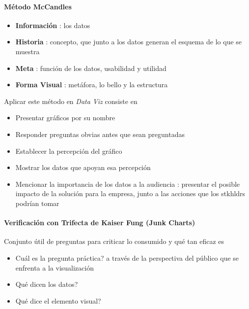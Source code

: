 \paragraph{Método McCandles}
\begin{itemize}
    \item {\textbf{Información} : los datos}
    \item {\textbf{Historia} : concepto, que junto a los datos generan el esquema de lo que se muestra}
    \item {\textbf{Meta} : función de los datos, usabilidad y utilidad}
    \item {\textbf{Forma Visual} : metáfora, lo bello y la estructura}
\end{itemize}
Aplicar este método en \textit{Data Viz} consiste en
\begin{itemize}
    \item {Presentar gráficos por su nombre}
    \item {Responder preguntas obvias antes que sean preguntadas}
    \item {Establecer la percepción del gráfico}
    \item {Mostrar los datos que apoyan esa percepción}
    \item {Mencionar la importancia de los datos a la audiencia : presentar el posible impacto de la solución para la empresa, junto a las acciones que los \gls{stkhldrs} podrían tomar}
\end{itemize}

\paragraph{Verificación con Trifecta de Kaiser Fung (Junk Charts)}
Conjunto útil de preguntas para criticar lo consumido y qué tan eficaz es
\begin{itemize}
    \item {Cuál es la pregunta práctica? a través de la perspectiva del público que se enfrenta a la visualización}
    \item {Qué dicen los datos?}
    \item {Qué dice el elemento visual?}
\end{itemize}


